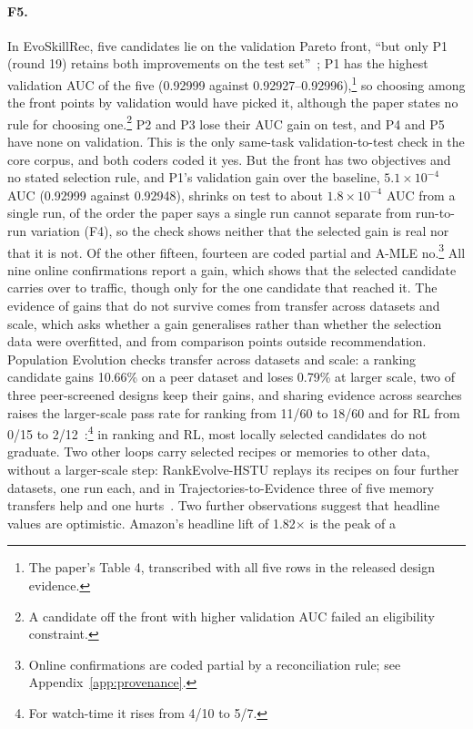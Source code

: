 \documentclass[sigconf,nonacm]{acmart}
\begin{document}
\paragraph{F5.} In EvoSkillRec, five candidates lie on the validation Pareto
front, ``but only P1 (round 19) retains both improvements on the test set''~\cite{li2026evoskillrec}; P1 has the
highest validation AUC of the five (0.92999 against 0.92927--0.92996),\footnote{The paper's Table 4, transcribed with all five rows in the released design evidence.} so choosing among the front points by validation would have picked it, although the paper states no rule for
choosing one.\footnote{A candidate off the front with higher validation AUC failed an eligibility constraint.} P2 and P3 lose their AUC gain on test, and P4 and P5 have none on validation. This is the only same-task
validation-to-test check in the core corpus, and both coders coded it yes. But
the front has two objectives and no stated selection rule, and P1's validation gain over the baseline, $5.1\times10^{-4}$ AUC (0.92999 against 0.92948), shrinks on test to about $1.8\times10^{-4}$ AUC from a
single run, of the order the paper says a single run cannot separate from run-to-run variation (F4), so the check
shows neither that the selected gain is real nor that it is not. Of the other fifteen, fourteen are coded partial and A-MLE no.\footnote{Online confirmations are coded partial by a reconciliation rule; see Appendix~\ref{app:provenance}.} All nine online confirmations report a gain, which shows that the selected candidate carries over to traffic, though only for the one candidate that reached it. The evidence of
gains that do not survive comes from transfer across datasets and scale, which asks whether a gain generalises rather
than whether the selection data were overfitted, and from comparison points outside recommendation. Population Evolution checks transfer across datasets and scale: a ranking candidate gains 10.66\% on a peer dataset and loses 0.79\% at
larger scale, two of three peer-screened designs keep their gains, and sharing evidence across searches raises the
larger-scale pass rate for ranking from 11/60 to 18/60 and for RL from 0/15 to 2/12~\cite{peng2026population}:\footnote{For watch-time it rises from 4/10 to
5/7.} in ranking and RL, most locally selected
candidates do not graduate. Two other loops carry selected recipes or memories to other data, without a larger-scale step: RankEvolve-HSTU replays its recipes on four further datasets, one run each, and in Trajectories-to-Evidence three of five memory transfers help and one hurts~\cite{chen2026rankevolve,zhuang2026trajectories}. Two further observations suggest that headline values are optimistic. Amazon's headline lift of 1.82$\times$ is the peak of a
\end{document}
